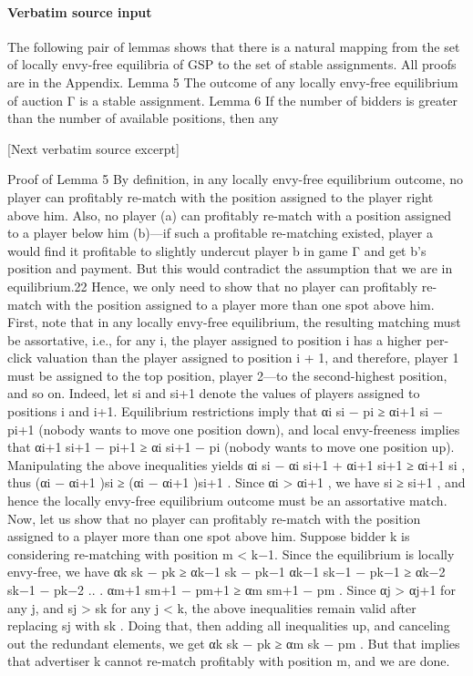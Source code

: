 \documentclass[10pt]{article}
\begin{document}
\paragraph{Verbatim source input}
\begin{ReviewVerbatim}
The following pair of lemmas shows that there is a natural mapping from the set of locally envy-free
equilibria of GSP to the set of stable assignments. All proofs are in the Appendix.
Lemma 5 The outcome of any locally envy-free equilibrium of auction Γ is a stable assignment.
Lemma 6 If the number of bidders is greater than the number of available positions, then any

[Next verbatim source excerpt]

Proof of Lemma 5
By definition, in any locally envy-free equilibrium outcome, no player can profitably re-match with
the position assigned to the player right above him. Also, no player (a) can profitably re-match
with a position assigned to a player below him (b)—if such a profitable re-matching existed, player
a would find it profitable to slightly undercut player b in game Γ and get b’s position and payment.
But this would contradict the assumption that we are in equilibrium.22
Hence, we only need to show that no player can profitably re-match with the position assigned
to a player more than one spot above him. First, note that in any locally envy-free equilibrium,
the resulting matching must be assortative, i.e., for any i, the player assigned to position i has a
higher per-click valuation than the player assigned to position i + 1, and therefore, player 1 must
be assigned to the top position, player 2—to the second-highest position, and so on.
Indeed, let si and si+1 denote the values of players assigned to positions i and i+1. Equilibrium
restrictions imply that αi si − pi ≥ αi+1 si − pi+1 (nobody wants to move one position down),
and local envy-freeness implies that αi+1 si+1 − pi+1 ≥ αi si+1 − pi (nobody wants to move one
position up). Manipulating the above inequalities yields αi si − αi si+1 + αi+1 si+1 ≥ αi+1 si , thus
(αi − αi+1 )si ≥ (αi − αi+1 )si+1 . Since αi > αi+1 , we have si ≥ si+1 , and hence the locally envy-free
equilibrium outcome must be an assortative match.
Now, let us show that no player can profitably re-match with the position assigned to a player
more than one spot above him. Suppose bidder k is considering re-matching with position m < k−1.
Since the equilibrium is locally envy-free, we have
αk sk − pk ≥ αk−1 sk − pk−1
αk−1 sk−1 − pk−1 ≥ αk−2 sk−1 − pk−2
..
.
αm+1 sm+1 − pm+1 ≥ αm sm+1 − pm .
Since αj > αj+1 for any j, and sj > sk for any j < k, the above inequalities remain valid after
replacing sj with sk . Doing that, then adding all inequalities up, and canceling out the redundant
elements, we get αk sk − pk ≥ αm sk − pm . But that implies that advertiser k cannot re-match
profitably with position m, and we are done.
\end{ReviewVerbatim}
\end{document}
